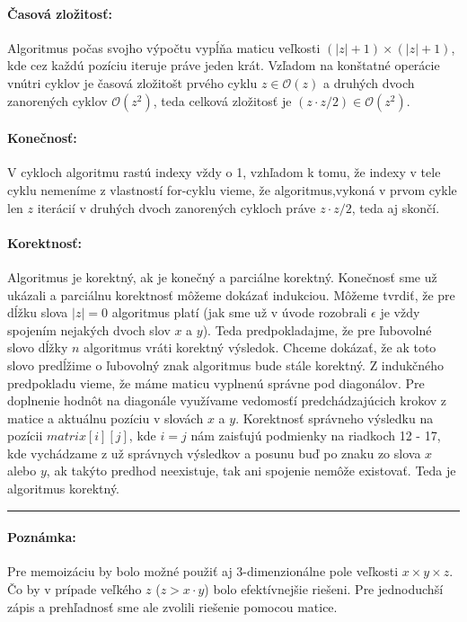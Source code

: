 \documentclass[12pt]{iv003}
\begin{document}
\newpage
\paragraph{Časová zložitosť:}
Algoritmus počas svojho výpočtu vypĺňa maticu veľkosti $(|z| + 1) \times (|z| + 1)$, kde cez každú pozíciu iteruje práve jeden krát. Vzľadom na konštatné operácie vnútri cyklov je časová zložitošt prvého cyklu $z \in \mathcal{O}(z)$ a druhých dvoch zanorených cyklov $\mathcal{O}(z^{2})$, teda celková zložitosť je $(z \cdot z/2) \in \mathcal{O}(z^{2})$.

\paragraph{Konečnosť:}
V cykloch algoritmu rastú indexy vždy o 1, vzhľadom k tomu, že indexy
v tele cyklu nemeníme z vlastností for-cyklu vieme, že algoritmus,vykoná v prvom cykle len $z$ iterácií v druhých dvoch zanorených cykloch práve $z \cdot z/2$, teda aj skončí.

\paragraph{Korektnosť:}
Algoritmus je korektný, ak je konečný a parciálne korektný. Konečnosť sme už ukázali a parciálnu korektnosť môžeme dokázať indukciou. Môžeme tvrdiť, že
pre dĺžku slova $|z| = 0$ algoritmus platí (jak sme už v úvode rozobrali $\epsilon $ je vždy spojením nejakých dvoch slov $x$ a $y$). Teda predpokladajme, že pre ľubovolné slovo dĺžky $n$ algoritmus vráti korektný výsledok. Chceme dokázať, že ak toto slovo predĺžime o ľubovolný znak algoritmus bude stále korektný. Z indukčného predpokladu vieme, že máme maticu vyplnenú správne pod diagonálov. Pre doplnenie hodnôt na diagonále využívame vedomosťí predchádzajúcich krokov z matice a aktuálnu pozíciu v slovách $x$ a $y$. Korektnosť správneho výsledku na pozícii $matrix[i][j]$, kde $i = j$ nám zaisťujú podmienky na riadkoch 12 - 17, kde vychádzame z už správnych výsledkov a posunu buď po znaku zo slova $x$ alebo $y$, ak takýto predhod neexistuje, tak ani spojenie nemôže existovať. Teda je algoritmus korektný.

\begin{center}
	\hrule
\end{center}
\paragraph{Poznámka:}
Pre memoizáciu by bolo možné použiť aj 3-dimenzionálne pole veľkosti $x \times y \times z$. Čo by v prípade veľkého $z$ ($z > x \cdot y$) bolo efektívnejšie riešeni. Pre jednoduchší zápis a prehľadnosť sme ale zvolili riešenie pomocou matice.
\end{document}
